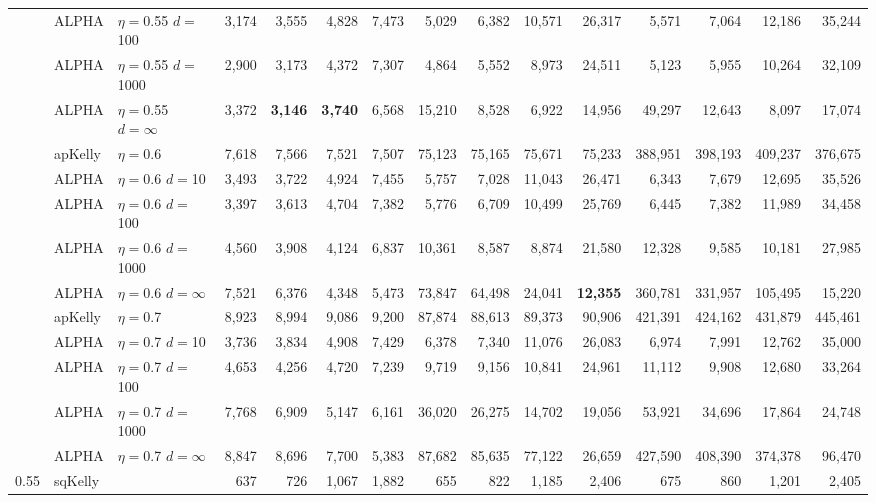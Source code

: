 \documentclass[12pt,runningheads]{llncs}
\begin{document}
{\begin{table}
\begin{tabular}{lll|rrrr|rrrr|rrrr}
& ALPHA & $\eta=$0.55 $d=$100 & 3,174  & 3,555  & 4,828  & 7,473  & 5,029  & 6,382  & 10,571  & 26,317  & 5,571  & 7,064  & 12,186  & 35,244  \\
& ALPHA & $\eta=$0.55 $d=$1000 & 2,900  & 3,173  & 4,372  & 7,307  & 4,864  & 5,552  & 8,973  & 24,511  & 5,123  & 5,955  & 10,264  & 32,109  \\
 & ALPHA & $\eta=$0.55 $d=\infty$ & 3,372  & \bf{3,146}  & \bf{3,740}  & 6,568  & 15,210  & 8,528  & 6,922  & 14,956  & 49,297  & 12,643  & 8,097  & 17,074  \\
\cline{2-15} & apKelly & $\eta=$0.6 & 7,618  & 7,566  & 7,521  & 7,507  & 75,123  & 75,165  & 75,671  & 75,233  & 388,951  & 398,193  & 409,237  & 376,675  \\
& ALPHA & $\eta=$0.6 $d=$10 & 3,493  & 3,722  & 4,924  & 7,455  & 5,757  & 7,028  & 11,043  & 26,471  & 6,343  & 7,679  & 12,695  & 35,526  \\
& ALPHA & $\eta=$0.6 $d=$100 & 3,397  & 3,613  & 4,704  & 7,382  & 5,776  & 6,709  & 10,499  & 25,769  & 6,445  & 7,382  & 11,989  & 34,458  \\
& ALPHA & $\eta=$0.6 $d=$1000 & 4,560  & 3,908  & 4,124  & 6,837  & 10,361  & 8,587  & 8,874  & 21,580  & 12,328  & 9,585  & 10,181  & 27,985  \\
 & ALPHA & $\eta=$0.6 $d=\infty$ & 7,521  & 6,376  & 4,348  & 5,473  & 73,847  & 64,498  & 24,041  & \bf{12,355}  & 360,781  & 331,957  & 105,495  & 15,220  \\
\cline{2-15} & apKelly & $\eta=$0.7 & 8,923  & 8,994  & 9,086  & 9,200  & 87,874  & 88,613  & 89,373  & 90,906  & 421,391  & 424,162  & 431,879  & 445,461  \\
& ALPHA & $\eta=$0.7 $d=$10 & 3,736  & 3,834  & 4,908  & 7,429  & 6,378  & 7,340  & 11,076  & 26,083  & 6,974  & 7,991  & 12,762  & 35,000  \\
& ALPHA & $\eta=$0.7 $d=$100 & 4,653  & 4,256  & 4,720  & 7,239  & 9,719  & 9,156  & 10,841  & 24,961  & 11,112  & 9,908  & 12,680  & 33,264  \\
& ALPHA & $\eta=$0.7 $d=$1000 & 7,768  & 6,909  & 5,147  & 6,161  & 36,020  & 26,275  & 14,702  & 19,056  & 53,921  & 34,696  & 17,864  & 24,748  \\
 & ALPHA & $\eta=$0.7 $d=\infty$ & 8,847  & 8,696  & 7,700  & 5,383  & 87,682  & 85,635  & 77,122  & 26,659  & 427,590  & 408,390  & 374,378  & 96,470  \\
\hline 0.55 & sqKelly & & 637  & 726  & 1,067  & 1,882  & 655  & 822  & 1,185  & 2,406  & 675  & 860  & 1,201  & 2,405  \\

\end{tabular}
\end{table}}
\end{document}
